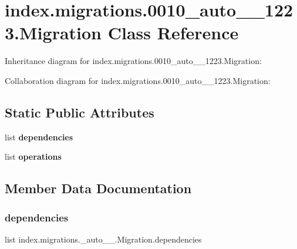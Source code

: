 \hypertarget{classindex_1_1migrations_1_10010__auto__20171024__1223_1_1Migration}{}\section{index.\+migrations.0010\+\_\+auto\+\_\+\_\+1223.Migration Class Reference}
\label{classindex_1_1migrations_1_10010__auto__20171024__1223_1_1Migration}


Inheritance diagram for index.\+migrations.0010\+\_\+auto\+\_\+\_\+1223.Migration\+:


Collaboration diagram for index.\+migrations.0010\+\_\+auto\+\_\+\_\+1223.Migration\+:
\subsection*{Static Public Attributes}
\begin{DoxyCompactItemize}
\item 
list {\bfseries dependencies}
\item 
list {\bfseries operations}
\end{DoxyCompactItemize}


\subsection{Member Data Documentation}
\mbox{\label{classindex_1_1migrations_1_10010__auto__20171024__1223_1_1Migration_a6223f6b12e11129393984c69fc90342a}} 
\subsubsection{\texorpdfstring{dependencies}{dependencies}}
{\footnotesize\ttfamily list index.\+migrations.\+\_\+auto\+\_\+\_.\+Migration.\+dependencies\hspace{0.3cm}{\ttfamily [static]}}

